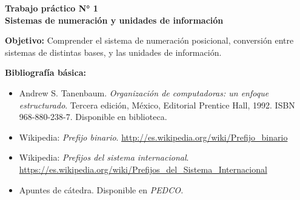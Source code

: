 \documentclass[12pt]{article}
\def\maketitle{

\makeatletter
{\color{bl} \centering \huge \sc \textbf{ Trabajo práctico N° 1\\ \large
\vspace*{-8pt} \color{black} Sistemas de numeración y unidades de información \vspace*{8pt} }\par}
\makeatother

\makeatletter


}
\begin{document}
\thispagestyle{empty}
\maketitle
\setlength{\parindent}{1pt}

\textbf{Objetivo:} Comprender el sistema de numeración posicional, conversión
entre sistemas de distintas bases, y las unidades de información.

\textbf{Bibliografía básica:}

\vspace{-2\topsep}
\begin{itemize}

    \itemsep2pt \parskip0pt 

    \item Andrew S. Tanenbaum. \emph{Organización de computadoras: un enfoque
        estructurado}. Tercera edición, México, Editorial Prentice Hall, 1992.
        ISBN 968-880-238-7. Disponible en biblioteca.

    \item Wikipedia: \emph{Prefijo binario}.
        \url{http://es.wikipedia.org/wiki/Prefijo_binario}

    \item Wikipedia: \emph{Prefijos del sistema internacional}.
        \url{https://es.wikipedia.org/wiki/Prefijos_del_Sistema_Internacional}

    \item Apuntes de cátedra. Disponible en \it{PEDCO}.

\end{itemize}
\end{document}
